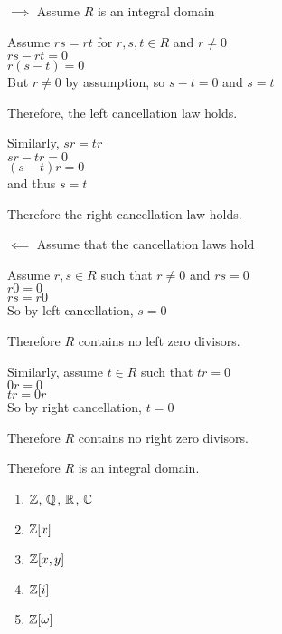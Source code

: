 \documentclass[letterpaper,12pt,fleqn]{article}
\begin{document}
\begin{theproof}
  \listbreak
  \begin{description}
  \item $\implies$ Assume $R$ is an integral domain

    Assume $rs=rt$ for $r,s,t\in R$ and $r\ne0$ \\
    $rs-rt=0$ \\
    $r(s-t)=0$ \\
    But $r\ne0$ by assumption, so $s-t=0$ and $s=t$

    Therefore, the left cancellation law holds.

    Similarly, $sr=tr$ \\
    $sr-tr=0$ \\
    $(s-t)r=0$ \\
    and thus $s=t$

    Therefore the right cancellation law holds.
\newpage
  \item $\impliedby$ Assume that the cancellation laws hold

    Assume $r,s\in R$ such that $r\ne0$ and $rs=0$ \\
    $r0=0$ \\
    $rs=r0$ \\
    So by left cancellation, $s=0$

    Therefore $R$ contains no left zero divisors.

    Similarly, assume $t\in R$ such that $tr=0$ \\
    $0r=0$ \\
    $tr=0r$ \\
    So by right cancellation, $t=0$
    
    Therefore $R$ contains no right zero divisors.

    Therefore $R$ is an integral domain.
  \end{description}
\end{theproof}

\begin{example}
  \listbreak
  \begin{enumerate}
  \item $\mathbb{Z}$, $\mathbb{Q}$, $\mathbb{R}$, $\mathbb{C}$
  \item $\mathbb{Z}[x]$
  \item $\mathbb{Z}[x,y]$
  \item $\mathbb{Z}[i]$
  \item $\mathbb{Z}[\omega]$
  \end{enumerate}
\end{example}
\end{document}
